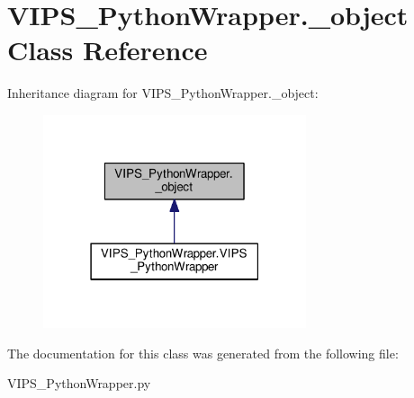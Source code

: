 \hypertarget{classVIPS__PythonWrapper_1_1__object}{}\section{V\+I\+P\+S\+\_\+\+Python\+Wrapper.\+\_\+object Class Reference}
\label{classVIPS__PythonWrapper_1_1__object}


Inheritance diagram for V\+I\+P\+S\+\_\+\+Python\+Wrapper.\+\_\+object\+:\nopagebreak
\begin{figure}[H]
\begin{center}
\leavevmode
\includegraphics[width=219pt]{classVIPS__PythonWrapper_1_1__object__inherit__graph}
\end{center}
\end{figure}


The documentation for this class was generated from the following file\+:\begin{DoxyCompactItemize}
\item 
V\+I\+P\+S\+\_\+\+Python\+Wrapper.\+py\end{DoxyCompactItemize}
